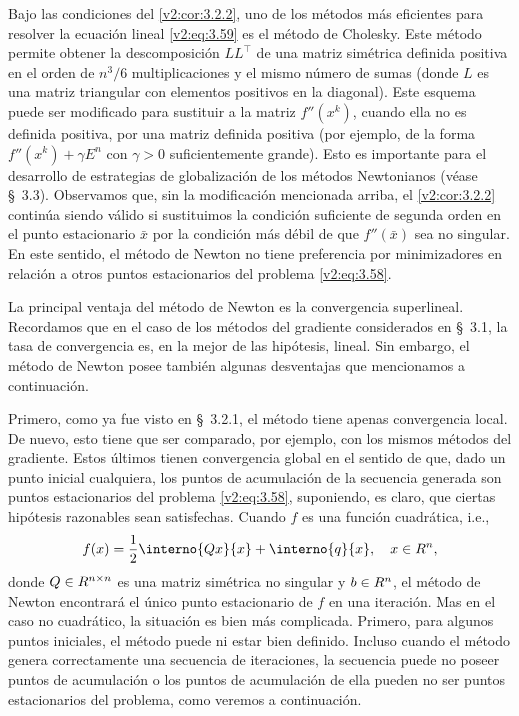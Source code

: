 Bajo las condiciones del \cref{v2:cor:3.2.2}, uno de los métodos más eficientes para resolver la ecuación lineal \eqref{v2:eq:3.59} es el método de Cholesky. Este método permite obtener la descomposición $LL^\top$ de una matriz simétrica definida positiva en el orden de $n^3/6$ multiplicaciones y el mismo número de sumas (donde $L$ es una matriz triangular con elementos positivos en la diagonal). Este esquema puede ser modificado para sustituir a la matriz $f''(x^k)$, cuando ella no es definida positiva, por una matriz definida positiva (por ejemplo, de la forma $f''(x^k) + \gamma E^n$ con $\gamma > 0$ suficientemente grande). Esto es importante para el desarrollo de estrategias de globalización de los métodos Newtonianos (véase \S~3.3). Observamos que, sin la modificación mencionada arriba, el \cref{v2:cor:3.2.2} continúa siendo válido si sustituimos la condición suficiente de segunda orden en el punto estacionario $\bar{x}$ por la condición más débil de que $f''(\bar{x})$ sea no singular. En este sentido, el método de Newton no tiene preferencia por minimizadores en relación a otros puntos estacionarios del problema \eqref{v2:eq:3.58}.

La principal ventaja del método de Newton es la convergencia superlineal. Recordamos que en el caso de los métodos del gradiente considerados en \S~3.1, la tasa de convergencia es, en la mejor de las hipótesis, lineal. Sin embargo, el método de Newton posee también algunas desventajas que mencionamos a continuación.

Primero, como ya fue visto en \S~3.2.1, el método tiene apenas convergencia local. De nuevo, esto tiene que ser comparado, por ejemplo, con los mismos métodos del gradiente. Estos últimos tienen convergencia global en el sentido de que, dado un punto inicial cualquiera, los puntos de acumulación de la secuencia generada son puntos estacionarios del problema \eqref{v2:eq:3.58}, suponiendo, es claro, que ciertas hipótesis razonables sean satisfechas. Cuando $f$ es una función cuadrática, i.e.,
\begin{equation}
    f(x) = \frac{1}{2}\interno{Qx}{x} + \interno{q}{x}, \quad x \in \Rn,
    \label{v2:eq:3.62}
\end{equation}
donde $Q \in R^{n \times n}$ es una matriz simétrica no singular y $b \in R^n$, el método de Newton encontrará el único punto estacionario de $f$ en una iteración. Mas en el caso no cuadrático, la situación es bien más complicada. Primero, para algunos puntos iniciales, el método puede ni estar bien definido. Incluso cuando el método genera correctamente una secuencia de iteraciones, la secuencia puede no poseer puntos de acumulación o los puntos de acumulación de ella pueden no ser puntos estacionarios del problema, como veremos a continuación.

